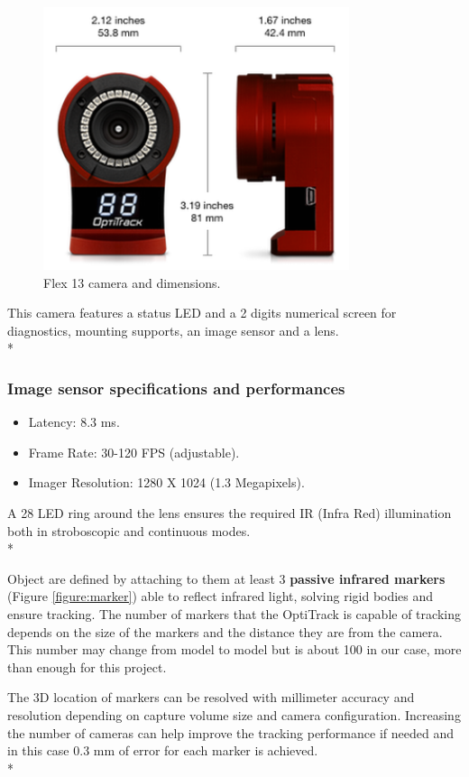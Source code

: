 \begin{figure}[H]
 \centering
 \includegraphics[width=0.8\textwidth]{flex13.PNG}
 \caption[Flex 13 Cameras]{Flex 13 camera and dimensions.}
 \label{figure:flex13}
\end{figure}

This camera features a status LED and a 2 digits numerical screen for diagnostics, mounting supports, an image sensor and a lens.\\*


\subsubsection{Image sensor specifications and performances}
\begin{itemize}
\item Latency: 8.3 ms.
\item Frame Rate: 30-120 FPS (adjustable).
\item Imager Resolution: 1280 X 1024 (1.3 Megapixels).
\end{itemize}

A 28 LED ring around the lens ensures the required IR (Infra Red) illumination both in stroboscopic and continuous modes. \\*

Object are defined by attaching to them at least 3 \textbf {passive infrared markers} (Figure \ref{figure:marker}) able to reflect infrared light, solving rigid bodies and ensure tracking. The number of markers that the OptiTrack is capable of tracking depends on the size of the markers and the distance they are from the camera. This number may change from model to model but is about 100 in our case, more than enough for this project.\par The 3D location of markers can be resolved with millimeter accuracy and resolution depending on capture volume size and camera configuration. Increasing the number of cameras can help improve the tracking performance if needed and in this case 0.3 mm of error for each marker is achieved. \\* 

